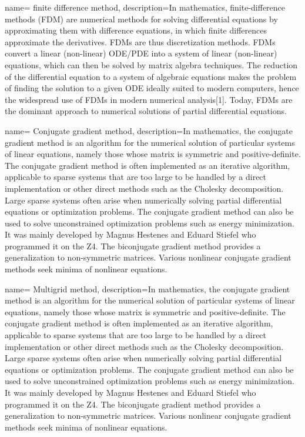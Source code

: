 {
        name= finite difference method,
        description={In mathematics, finite-difference methods (FDM) are numerical methods for solving differential equations by approximating them with difference equations, in which finite differences approximate the derivatives. FDMs are thus discretization methods. FDMs convert a linear (non-linear) ODE/PDE into a system of linear (non-linear) equations, which can then be solved by matrix algebra techniques. The reduction of the differential equation to a system of algebraic equations makes the problem of finding the solution to a given ODE ideally suited to modern computers, hence the widespread use of FDMs in modern numerical analysis[1]. Today, FDMs are the dominant approach to numerical solutions of partial differential equations.}
}

{
        name= Conjugate gradient method,
        description={In mathematics, the conjugate gradient method is an algorithm for the numerical solution of particular systems of linear equations, namely those whose matrix is symmetric and positive-definite. The conjugate gradient method is often implemented as an iterative algorithm, applicable to sparse systems that are too large to be handled by a direct implementation or other direct methods such as the Cholesky decomposition. Large sparse systems often arise when numerically solving partial differential equations or optimization problems. The conjugate gradient method can also be used to solve unconstrained optimization problems such as energy minimization. It was mainly developed by Magnus Hestenes and Eduard Stiefel who programmed it on the Z4. The biconjugate gradient method provides a generalization to non-symmetric matrices. Various nonlinear conjugate gradient methods seek minima of nonlinear equations.}
}

{
        name= Multigrid method,
        description={In mathematics, the conjugate gradient method is an algorithm for the numerical solution of particular systems of linear equations, namely those whose matrix is symmetric and positive-definite. The conjugate gradient method is often implemented as an iterative algorithm, applicable to sparse systems that are too large to be handled by a direct implementation or other direct methods such as the Cholesky decomposition. Large sparse systems often arise when numerically solving partial differential equations or optimization problems. The conjugate gradient method can also be used to solve unconstrained optimization problems such as energy minimization. It was mainly developed by Magnus Hestenes and Eduard Stiefel who programmed it on the Z4. The biconjugate gradient method provides a generalization to non-symmetric matrices. Various nonlinear conjugate gradient methods seek minima of nonlinear equations.}
}

